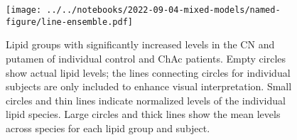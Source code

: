 \documentclass[letterpaper]{article}
\begin{document}
\begin{figure}[p]
\begin{center}
	\texttt{[image: ../../notebooks/2022-09-04-mixed-models/named-figure/line-ensemble.pdf]}
\end{center}
	\caption[Significant lipid changes in individual control and ChAc patients]{
		Lipid groups with significantly increased levels in the CN and putamen of
		individual control and ChAc patients. Empty circles show actual lipid
		levels; the lines connecting circles for individual subjects are only
		included to enhance visual interpretation. Small circles and thin lines
		indicate normalized levels of the individual lipid species. Large circles
		and thick lines show the mean levels across species for each lipid group and
		subject.
}
\label{fig:individual-changes}
\end{figure}
\end{document}
